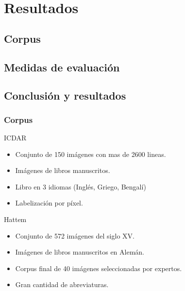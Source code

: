 \documentclass[spanish]{beamer}
\begin{document}
\section{Resultados}
\subsection{Corpus}
\subsection{Medidas de evaluación}
\subsection{Conclusión y resultados}

\begin{frame}
\frametitle{Corpus}
\begin{block}{ICDAR}
\begin{itemize}
\item[] Conjunto de 150 imágenes con mas de 2600 lineas.
\item[] Imágenes de libros manuscritos.
\item[] Libro en 3 idiomas (Inglés, Griego, Bengalí)
\item[] Labelización por píxel.
\end{itemize}
\end{block}

\begin{block}{Hattem}
\begin{itemize}
\item[] Conjunto de 572 imágenes del siglo XV.
\item[] Imágenes de libros manuscritos en Alemán.
\item[] Corpus final de 40 imágenes seleccionadas por expertos.
\item[] Gran cantidad de abreviaturas.
\end{itemize}
\end{block}
\end{frame}

\end{document}
